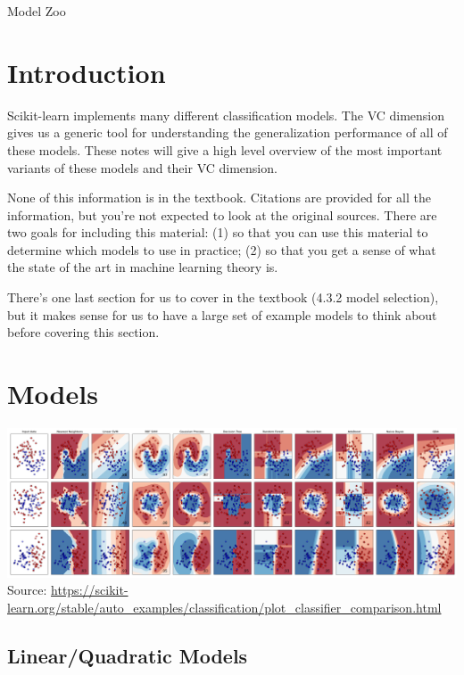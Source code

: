 \documentclass[10pt]{exam}
\theoremstyle{definition}
\begin{document}
\begin{center}
{
\Huge
Model Zoo
}
\end{center}

\section{Introduction}

Scikit-learn implements many different classification models.
The VC dimension gives us a generic tool for understanding the generalization performance of all of these models.
These notes will give a high level overview of the most important variants of these models and their VC dimension.

None of this information is in the textbook.
Citations are provided for all the information,
but you're not expected to look at the original sources.
There are two goals for including this material:
(1) so that you can use this material to determine which models to use in practice;
(2) so that you get a sense of what the state of the art in machine learning theory is.

There's one last section for us to cover in the textbook
(4.3.2 model selection),
but it makes sense for us to have a large set of example models to think about before covering this section.

\section{Models}

\begin{center}
    \hspace*{-0.75in}\includegraphics[width=8in]{sphx_glr_plot_classifier_comparison_001}
    \small
    Source: \url{https://scikit-learn.org/stable/auto_examples/classification/plot_classifier_comparison.html}
\end{center}
\newpage
\subsection{Linear/Quadratic Models}
\end{document}
